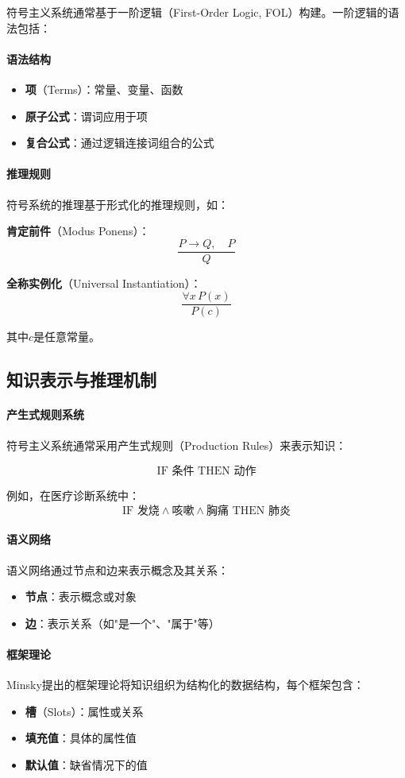 符号主义系统通常基于一阶逻辑（First-Order Logic, FOL）构建。一阶逻辑的语法包括：

\paragraph{语法结构}
\begin{itemize}
\item \textbf{项}（Terms）：常量、变量、函数
\item \textbf{原子公式}：谓词应用于项
\item \textbf{复合公式}：通过逻辑连接词组合的公式
\end{itemize}

\paragraph{推理规则}
符号系统的推理基于形式化的推理规则，如：

\textbf{肯定前件}（Modus Ponens）：
$$\frac{P \rightarrow Q, \quad P}{Q}$$

\textbf{全称实例化}（Universal Instantiation）：
$$\frac{\forall x \, P(x)}{P(c)}$$

其中$c$是任意常量。

\subsection{知识表示与推理机制}

\paragraph{产生式规则系统}
符号主义系统通常采用产生式规则（Production Rules）来表示知识：

$$\text{IF } \text{条件} \text{ THEN } \text{动作}$$

例如，在医疗诊断系统中：
$$\text{IF } \text{发烧} \land \text{咳嗽} \land \text{胸痛} \text{ THEN } \text{肺炎}$$

\paragraph{语义网络}
语义网络通过节点和边来表示概念及其关系：
\begin{itemize}
\item \textbf{节点}：表示概念或对象
\item \textbf{边}：表示关系（如"是一个"、"属于"等）
\end{itemize}

\paragraph{框架理论}
Minsky提出的框架理论将知识组织为结构化的数据结构，每个框架包含：
\begin{itemize}
\item \textbf{槽}（Slots）：属性或关系
\item \textbf{填充值}：具体的属性值
\item \textbf{默认值}：缺省情况下的值
\end{itemize}


